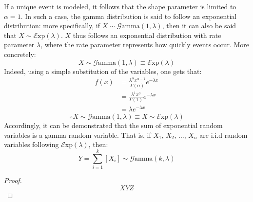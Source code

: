 \documentclass[12pt]{article}
\newcommand{\E}{\mathcal{E}}
\newcommand{\G}{\mathcal{G}}
\begin{document}
If a unique event is modeled, it follows that the shape parameter is limited to $\alpha = 1$. In such a case, the gamma
distribution is said to follow an exponential distribution: more specifically, if $X\sim\G\text{amma}(1, \lambda)$, then
it can also be said that $X\sim\E\text{xp}(\lambda)$. $X$ thus follows an exponential distribution with rate parameter
$\lambda$, where the rate parameter represents how quickly events occur. More concretely:
\begin{equation}
	X\sim\G\text{amma}(1, \lambda)\equiv\E\text{xp}(\lambda)
\end{equation}
Indeed, using a simple substitution of the variables, one gets that:
\begin{equation}\label{eq:relation:exp}
	\begin{split}
		f(x)	&=	\frac{\lambda^\alpha x^{\alpha-1}}{\Gamma(\alpha)}e^{-\lambda x}\\
				&=	\frac{\lambda^1 x^{0}}{\Gamma(1)}e^{-\lambda x}\\
				&=	\lambda e^{-\lambda x}
	\end{split}
\end{equation}
\begin{equation}
	\therefore X\sim\G\text{amma}(1, \lambda)\equiv X\sim\E\text{xp}(\lambda)
\end{equation}
Accordingly, it can be demonstrated that the sum of exponential random variables is a gamma random variable. That is, if
$X_1,\,X_2,\,\ldots,\,X_n$ are i.i.d random variables following $\E\text{xp}(\lambda)$, then:
\begin{equation}
	Y=\sum^k_{i=1}\left[X_i\right]\sim\G\text{amma}(k, \lambda)
\end{equation}
\begin{proof}
	\begin{equation}
		XYZ
	\end{equation}
\end{proof}


\pagebreak
\end{document}
